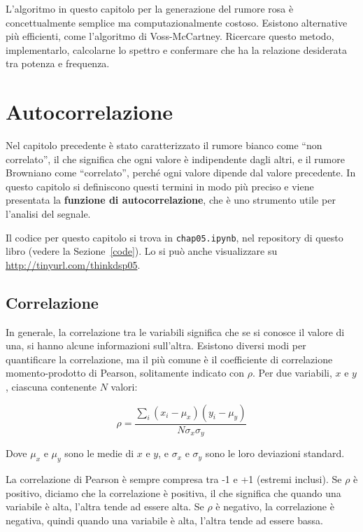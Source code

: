 \documentclass[12pt,a4paper]{book}
\begin{document}
\begin{exercise} L'algoritmo in questo capitolo per la generazione del rumore rosa è concettualmente semplice ma computazionalmente costoso. Esistono alternative più efficienti, come l'algoritmo di Voss-McCartney. Ricercare questo metodo, implementarlo, calcolarne lo spettro e confermare che ha la relazione desiderata tra potenza e frequenza. \end{exercise} 

\chapter{Autocorrelazione} 

Nel capitolo precedente è stato caratterizzato il rumore bianco come ``non correlato'', il che significa che ogni valore è indipendente dagli altri, e il rumore Browniano come ``correlato'', perché ogni valore dipende dal valore precedente. In questo capitolo si definiscono questi termini in modo più preciso e viene presentata la {\bf funzione di autocorrelazione}, che è uno strumento utile per l'analisi del segnale.

Il codice per questo capitolo si trova in {\tt chap05.ipynb}, nel repository di questo libro (vedere la Sezione~\ref{code}). Lo si può anche visualizzare su \url{http://tinyurl.com/thinkdsp05}.

\section{Correlazione} 

In generale, la correlazione tra le variabili significa che se si conosce il valore di una, si hanno alcune informazioni sull'altra. Esistono diversi modi per quantificare la correlazione, ma il più comune è il coefficiente di correlazione momento-prodotto di Pearson, solitamente indicato con $\rho$. Per due variabili, $x$ e $y$, ciascuna contenente $N$ valori:

%
\[ \rho = \frac{ \sum_i (x_i - \mu_x) (y_i - \mu_y)}{N \sigma_x \sigma_y} \] 

%
Dove $\mu_x$ e $\mu_y$ sono le medie di $x$ e $y$, e $\sigma_x$ e $\sigma_y$ sono le loro deviazioni standard.

La correlazione di Pearson è sempre compresa tra -1 e +1 (estremi inclusi). Se $\rho$ è positivo, diciamo che la correlazione è positiva, il che significa che quando una variabile è alta, l'altra tende ad essere alta. Se $\rho$ è negativo, la correlazione è negativa, quindi quando una variabile è alta, l'altra tende ad essere bassa.
\end{document}
